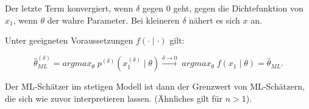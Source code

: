 \documentclass[10pt]{article}
\begin{document}
	Der letzte Term konvergiert, wenn $\delta$ gegen $0$ geht, gegen die Dichtefunktion von $x_1$, wenn $\theta$ der wahre Parameter. Bei kleineren $\delta$ nähert es sich $x$ an. 
	
	Unter geeigneten Voraussetzungen $f(\cdot\mid\cdot)$ gilt:
	
	\begin{equation*}
		\hat{\theta}_{ML}^{\left(\delta\right)} = argmax_\theta \; p^{\left(\delta\right)} (x^{\left(\delta\right)}_1 \mid \theta) \overset{\delta \rightarrow 0} \longrightarrow \;argmax_\theta \; f(x_1 \mid \theta) = \hat{\theta}_{ML}.
	\end{equation*}
	
	Der ML-Schätzer im stetigen Modell ist dann der Grenzwert von ML-Schätzern, die sich wie zuvor interpretieren lassen. (Ähnliches gilt für $n>1$).
	
\end{document}
